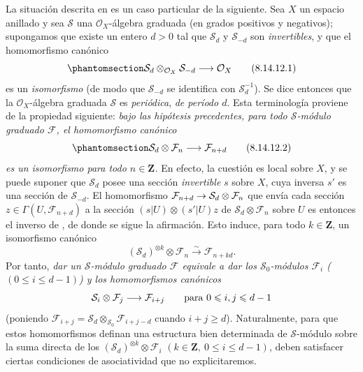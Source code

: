 \documentclass[oneside,10pt]{amsart}
\makeatletter
\newcommand{\ega@arrow}[2]{\mathchoice{#1}{#2}{#2}{#2}}
\renewcommand{\to}{\ega@arrow{\longrightarrow}{\rightarrow}}
\let\EGAOriginalLabel\label
\renewcommand{\label}[1]{\phantomsection\EGAOriginalLabel{#1}}
\makeatother
\begin{document}
\begin{remark}[8.14.12]
\label{II.8.14.12-fr}
La situación descrita en  es un caso particular de la siguiente.
Sea $X$ un espacio anillado y sea $\mathcal{S}$ una $\mathcal{O}_X$-álgebra graduada (en grados positivos y negativos);
supongamos que existe un entero $d>0$ tal que $\mathcal{S}_d$ y $\mathcal{S}_{-d}$ son \emph{invertibles}, y que el homomorfismo canónico
\begin{equation}
\label{II.8.14.12.1-fr}
  \mathcal{S}_d\otimes_{\mathcal{O}_X}\mathcal{S}_{-d}
  \to\mathcal{O}_X
\tag{8.14.12.1}
\end{equation}
es un \emph{isomorfismo} (de modo que $\mathcal{S}_{-d}$ se identifica con $\mathcal{S}_d^{-1}$).
Se dice entonces que la $\mathcal{O}_X$-álgebra graduada $\mathcal{S}$ es \emph{periódica}, \emph{de período $d$}.
Esta terminología proviene de la propiedad siguiente:
\emph{bajo las hipótesis precedentes, para todo $\mathcal{S}$-módulo graduado $\mathcal{F}$, el homomorfismo canónico}
\begin{equation}
\label{II.8.14.12.2-fr}
  \mathcal{S}_d\otimes\mathcal{F}_n\to\mathcal{F}_{n+d}
\tag{8.14.12.2}
\end{equation}
\emph{es un isomorfismo para todo $n\in\mathbf{Z}$.}
En efecto, la cuestión es local sobre $X$, y se puede suponer que $\mathcal{S}_d$ posee una sección \emph{invertible} $s$ sobre $X$, cuya inversa $s'$ es una sección de $\mathcal{S}_{-d}$.
El homomorfismo $\mathcal{F}_{n+d}\to\mathcal{S}_d\otimes\mathcal{F}_n$ que envía cada sección $z\in\Gamma(U,\mathcal{F}_{n+d})$ a la sección $(s|U)\otimes(s'|U)z$ de $\mathcal{S}_d\otimes\mathcal{F}_n$ sobre $U$ es entonces el inverso de , de donde se sigue la afirmación.
Esto induce, para todo $k\in\mathbf{Z}$, un isomorfismo canónico
\[
  (\mathcal{S}_d)^{\otimes k}\otimes\mathcal{F}_n
  \xrightarrow{\sim}\mathcal{F}_{n+kd}.
\]
Por tanto, \emph{dar un $\mathcal{S}$-módulo graduado $\mathcal{F}$ equivale a dar los $\mathcal{S}_0$-módulos $\mathcal{F}_i$ ($(0\leqslant i\leqslant d-1)$) y los homomorfismos canónicos}
\[
  \mathcal{S}_i\otimes\mathcal{F}_j\to\mathcal{F}_{i+j}
  \qquad\text{para }0\leqslant i,j\leqslant d-1
\]
(poniendo $\mathcal{F}_{i+j}=\mathcal{S}_d\otimes_{\mathcal{S}_0}
\mathcal{F}_{i+j-d}$ cuando $i+j\geqslant d$).
Naturalmente, para que estos homomorfismos definan una estructura bien determinada de $\mathcal{S}$-módulo sobre la suma directa de los $(\mathcal{S}_d)^{\otimes k}\otimes\mathcal{F}_i$ $(k\in\mathbf{Z},\ 0\leqslant i\leqslant d-1)$, deben satisfacer ciertas condiciones de asociatividad que no explicitaremos.


\end{remark}
\end{document}
